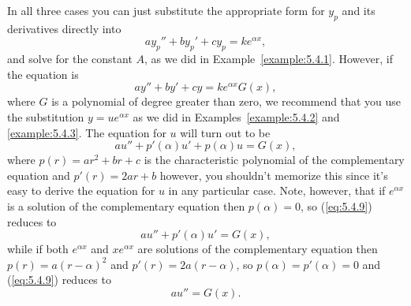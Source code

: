 \documentclass{ximera}
\begin{document}

In all three cases you can just substitute the appropriate form for
$y_p$ and its derivatives directly into
$$
ay_p''+by_p'+cy_p=ke^{\alpha x},
$$
and solve for the constant $A$, as we did in
Example~\ref{example:5.4.1}.
However, if the equation is
$$
ay''+by'+cy=k e^{\alpha x}G(x),
$$
where $G$ is a polynomial of degree greater than zero, we recommend
that you use the substitution $y=ue^{\alpha x}$ as we did in
Examples~\ref{example:5.4.2} and \ref{example:5.4.3}. The equation for $u$
will turn out to be
\begin{equation} \label{eq:5.4.9}
au''+p'(\alpha)u'+p(\alpha)u=G(x),
\end{equation}
where $p(r)=ar^2+br+c$ is the characteristic polynomial of the
complementary equation and $p'(r)=2ar+b$ %
however, you shouldn't memorize this since it's easy to derive the
equation for $u$ in any particular case. Note, however, that if
$e^{\alpha x}$ is a solution of the complementary equation then
$p(\alpha)=0$, so (\ref{eq:5.4.9}) reduces to
$$
au''+p'(\alpha)u'=G(x),
$$
while if both $e^{\alpha x}$ and $xe^{\alpha x}$ are solutions of the
complementary equation then $p(r)=a(r-\alpha)^2$ and
$p'(r)=2a(r-\alpha)$, so $p(\alpha)=p'(\alpha)=0$ and (\ref{eq:5.4.9})
reduces to
$$
au''=G(x).
$$
\end{document}
